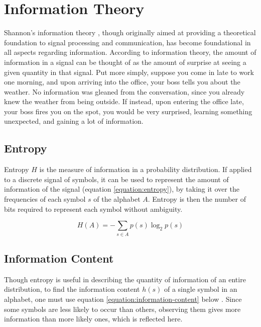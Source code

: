 \section{Information Theory}
\label{section:information-theory}

Shannon's information theory \citep{shannon1948mathematical}, though originally aimed at providing a theoretical foundation to signal processing and communication, has become foundational in all aspects regarding information.  According to information theory, the amount of information in a signal can be thought of as the amount of surprise at seeing a given quantity in that signal.  Put more simply, suppose you come in late to work one morning, and upon arriving into the office, your boss tells you about the weather. No information was gleaned from the conversation, since you already knew the weather from being outside.  If instead, upon entering the office late, your boss fires you on the spot, you would be very surprised, learning something unexpected, and gaining a lot of information.

\subsection{Entropy}
\label{subsection:entropy}

Entropy $H$ is the measure of information in a probability distribution.  If applied to a discrete signal of symbols, it can be used to represent the amount of information of the signal (equation \ref{equation:entropy}), by taking it over the frequencies of each symbol $s$ of the alphabet $A$.  Entropy is then the number of bits required to represent each symbol without ambiguity.

\begin{equation}
  \label{equation:entropy}
  H(A) = - \sum_{s \in A} p(s) \log_2 p(s)
\end{equation}

\subsection{Information Content}
\label{subsection:information-content}

Though entropy is useful in describing the quantity of information of an entire distribution, to find the information content $h(s)$ of a single symbol in an alphabet, one must use equation \ref{equation:information-content} below \citep{mackay2003information}. Since some symbols are less likely to occur than others, observing them gives more information than more likely ones, which is reflected here.

